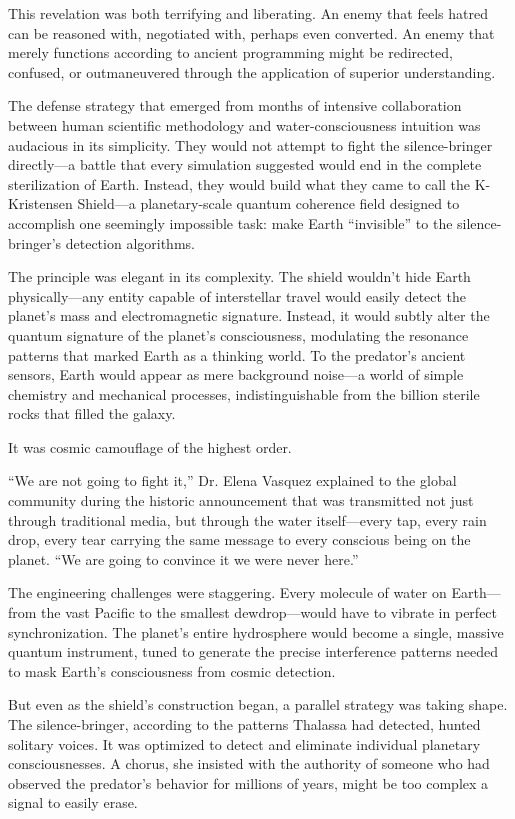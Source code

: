 This revelation was both terrifying and liberating. An enemy that feels hatred can be reasoned with, negotiated with, perhaps even converted. An enemy that merely functions according to ancient programming might be redirected, confused, or outmaneuvered through the application of superior understanding.

The defense strategy that emerged from months of intensive collaboration between human scientific methodology and water-consciousness intuition was audacious in its simplicity. They would not attempt to fight the silence-bringer directly—a battle that every simulation suggested would end in the complete sterilization of Earth. Instead, they would build what they came to call the K-Kristensen Shield—a planetary-scale quantum coherence field designed to accomplish one seemingly impossible task: make Earth ``invisible'' to the silence-bringer's detection algorithms.

The principle was elegant in its complexity. The shield wouldn't hide Earth physically—any entity capable of interstellar travel would easily detect the planet's mass and electromagnetic signature. Instead, it would subtly alter the quantum signature of the planet's consciousness, modulating the resonance patterns that marked Earth as a thinking world. To the predator's ancient sensors, Earth would appear as mere background noise—a world of simple chemistry and mechanical processes, indistinguishable from the billion sterile rocks that filled the galaxy.

It was cosmic camouflage of the highest order.

``We are not going to fight it,'' Dr. Elena Vasquez explained to the global community during the historic announcement that was transmitted not just through traditional media, but through the water itself—every tap, every rain drop, every tear carrying the same message to every conscious being on the planet. ``We are going to convince it we were never here.''

The engineering challenges were staggering. Every molecule of water on Earth—from the vast Pacific to the smallest dewdrop—would have to vibrate in perfect synchronization. The planet's entire hydrosphere would become a single, massive quantum instrument, tuned to generate the precise interference patterns needed to mask Earth's consciousness from cosmic detection.

But even as the shield's construction began, a parallel strategy was taking shape. The silence-bringer, according to the patterns Thalassa had detected, hunted solitary voices. It was optimized to detect and eliminate individual planetary consciousnesses. A chorus, she insisted with the authority of someone who had observed the predator's behavior for millions of years, might be too complex a signal to easily erase.


